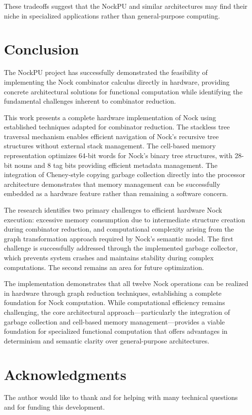 \documentclass[twoside]{article}
\begin{document}
\noindent
These tradeoffs suggest that the NockPU and similar architectures may find their niche in specialized applications rather than general-purpose computing.

\section{Conclusion}

The NockPU project has successfully demonstrated the feasibility of implementing the Nock combinator calculus directly in hardware, providing concrete architectural solutions for functional computation while identifying the fundamental challenges inherent to combinator reduction.

This work presents a complete hardware implementation of Nock using established techniques adapted for combinator reduction. The stackless tree traversal mechanism enables efficient navigation of Nock's recursive tree structures without external stack management. The cell-based memory representation optimizes 64-bit words for Nock's binary tree structures, with 28-bit nouns and 8 tag bits providing efficient metadata management. The integration of Cheney-style copying garbage collection directly into the processor architecture demonstrates that memory management can be successfully embedded as a hardware feature rather than remaining a software concern.

The research identifies two primary challenges to efficient hardware Nock execution: excessive memory consumption due to intermediate structure creation during combinator reduction, and computational complexity arising from the graph transformation approach required by Nock's semantic model. The first challenge is successfully addressed through the implemented garbage collector, which prevents system crashes and maintains stability during complex computations. The second remains an area for future optimization.

The implementation demonstrates that all twelve Nock operations can be realized in hardware through graph reduction techniques, establishing a complete foundation for Nock computation. While computational efficiency remains challenging, the core architectural approach—particularly the integration of garbage collection and cell-based memory management—provides a viable foundation for specialized functional computation that offers advantages in determinism and semantic clarity over general-purpose architectures. \tombstone

\section*{Acknowledgments}

The author would like to thank {} and {} for helping with many technical questions and {} for funding this development.

\printbibliography
\end{document}
